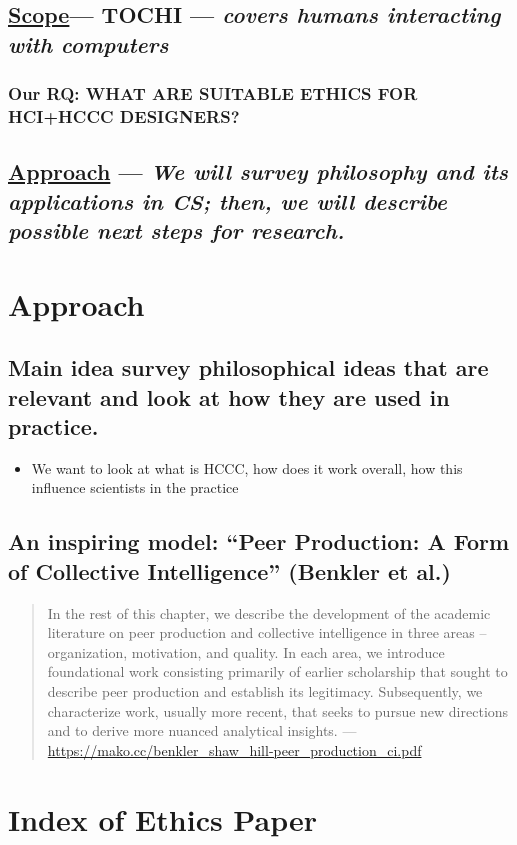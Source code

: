 \documentclass[11pt]{article}
\begin{document}
\subsection{\hyperref[sec:org20e667e]{Scope}— TOCHI — \emph{covers humans interacting with computers}}
\label{sec:org6d7f577}
\subsubsection{Our RQ: WHAT ARE SUITABLE ETHICS FOR HCI+HCCC DESIGNERS?}
\label{sec:orgdd29601}
\subsection{\hyperref[sec:orgf4c7de5]{Approach} — \emph{We will survey philosophy and its applications in CS; then, we will describe possible next steps for research.}}
\label{sec:org11b292a}
\section{Approach}
\label{sec:orgf4c7de5}
\subsection{Main idea survey philosophical ideas that are relevant and look at how they are used in practice.}
\label{sec:orgec475e8}
\begin{itemize}
\item We want to look at what is HCCC, how does it work overall, how this influence scientists in the practice
\end{itemize}
\subsection{An inspiring model: “Peer Production: A Form of Collective Intelligence” (Benkler et al.)}
\label{sec:org5837ab1}
\begin{quote}
In the rest of this chapter, we describe the development of the
academic literature on peer production and collective intelligence in
three areas – organization, motivation, and quality. In each area, we
introduce foundational work consisting primarily of earlier
scholarship that sought to describe peer production and establish its
legitimacy. Subsequently, we characterize work, usually more recent,
that seeks to pursue new directions and to derive more nuanced
analytical insights. — \url{https://mako.cc/benkler\_shaw\_hill-peer\_production\_ci.pdf}
\end{quote}
\section{Index of Ethics Paper}
\label{sec:orgafe7207}
\end{document}

